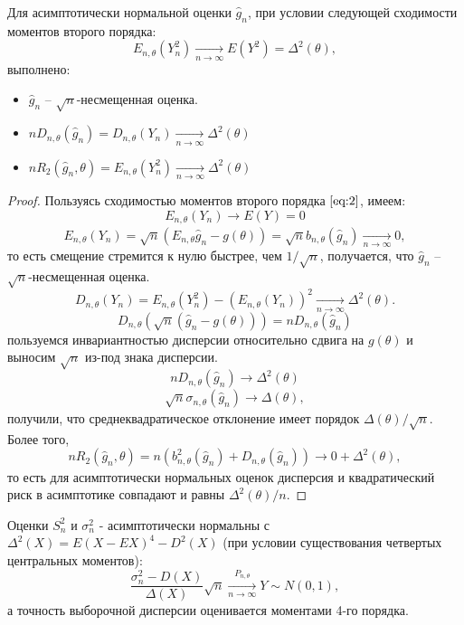 \begin{proposition}
    Для асимптотически нормальной оценки $\hat{g}_n$, при условии следующей сходимости моментов второго порядка:
    \begin{equation}
      E_{n, \theta}(Y_n^2) \xrightarrow[n \to \infty]{} E(Y^2) =
      \Delta^2(\theta)\label{eq:2},
    \end{equation}
    выполнено:
    \begin{itemize}
        \item $\hat{g}_n$ -- $\sqrt{n}$-несмещенная оценка.
        \item $nD_{n, \theta}(\hat{g}_n) = D_{n, \theta}(Y_n)
            \xrightarrow[n \to \infty]{} \Delta^2(\theta)$
        \item $nR_2(\hat{g}_n, \theta) = E_{n, \theta}(Y^2_n)
            \xrightarrow[n \to \infty]{} \Delta^2(\theta)$
    \end{itemize}
\end{proposition}
\begin{proof}
    \enewline
      Пользуясь сходимостью моментов второго порядка $\ref{eq:2}$, имеем:
    \[
       E_{n, \theta}(Y_n) \xrightarrow[]{} E(Y) = 0
    \]
    \[
       E_{n, \theta}(Y_n) = \sqrt{n}(E_{n, \theta}\hat{g}_n - g(\theta)) =
       \sqrt{n}b_{n, \theta}(\hat{g}_n) \xrightarrow[n \to \infty]{} 0
    ,\]
    то есть смещение стремится к нулю быстрее, чем $1/\sqrt{n}$, получается, что $\hat{g}_n$ -- $\sqrt{n}$-несмещенная оценка.
    \[
        D_{n, \theta}(Y_n) = E_{n, \theta}(Y_n^2) - (E_{n, \theta}(Y_n))^2
        \xrightarrow[n \to \infty]{} \Delta^2(\theta)
    .\]
    \[
        D_{n, \theta}(\sqrt{n}(\hat{g}_n - g(\theta))) = nD_{n, \theta}
        (\hat{g}_n)
    \] пользуемся инвариантностью дисперсии относительно сдвига на $g(\theta)$ и выносим $\sqrt{n}$ из-под знака
    дисперсии.
    \[
        nD_{n, \theta}(\hat{g}_n) \xrightarrow[]{} \Delta^2(\theta)
    \]
    \[
        \sqrt{n}\sigma_{n, \theta}(\hat{g}_n) \xrightarrow[]{} \Delta(\theta)
    ,\]
    получили, что среднеквадратическое отклонение имеет порядок
    $\Delta(\theta)/\sqrt{n}$.
    Более того,
    \[
        nR_2(\hat{g}_n, \theta) = n(b_{n, \theta}^2(\hat{g}_n) +
        D_{n, \theta}(\hat{g}_n)) \xrightarrow[]{} 0 + \Delta^2(\theta)
    ,\]
    то есть для асимптотически нормальных оценок дисперсия и квадратический
    риск в асимптотике совпадают и равны $\Delta^2(\theta)/n$.
\end{proof}

\begin{proposition}
    Оценки $S^2_n$ и $\sigma^2_n$ - асимптотически нормальны с
    $\Delta^2(X) = E(X - EX)^4 - D^2(X)$ (при условии существования четвертых
    центральных моментов):
    \[
      \frac{\sigma^2_n - D(X)}{\Delta(X)}\sqrt{n}
      \xrightarrow[n \to \infty]{P_{n, \theta}} Y \sim N(0, 1)
    ,\] а точность выборочной дисперсии оценивается моментами 4-го порядка.
\end{proposition}

